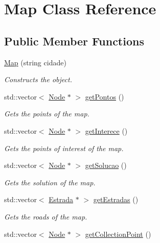 \hypertarget{class_map}{}\section{Map Class Reference}
\label{class_map}
\subsection*{Public Member Functions}
\begin{DoxyCompactItemize}
\item 
\mbox{\hyperlink{class_map_a5376d6db6b0115c9260976e44f2956a0}{Map}} (string cidade)
\begin{DoxyCompactList}\small\item\em Constructs the object. \end{DoxyCompactList}\item 
std\+::vector$<$ \mbox{\hyperlink{class_node}{Node}} $\ast$ $>$ \mbox{\hyperlink{class_map_adfbd0b149bb751e0ac8696c75b7649a6}{get\+Pontos}} ()
\begin{DoxyCompactList}\small\item\em Gets the points of the map. \end{DoxyCompactList}\item 
std\+::vector$<$ \mbox{\hyperlink{class_node}{Node}} $\ast$ $>$ \mbox{\hyperlink{class_map_a1f3f1eff9d45c161fba74967a52a0d0f}{get\+Interece}} ()
\begin{DoxyCompactList}\small\item\em Gets the points of interest of the map. \end{DoxyCompactList}\item 
std\+::vector$<$ \mbox{\hyperlink{class_node}{Node}} $\ast$ $>$ \mbox{\hyperlink{class_map_ab13f74de95fc679221c7c46f327fb43e}{get\+Solucao}} ()
\begin{DoxyCompactList}\small\item\em Gets the solution of the map. \end{DoxyCompactList}\item 
std\+::vector$<$ \mbox{\hyperlink{class_estrada}{Estrada}} $\ast$ $>$ \mbox{\hyperlink{class_map_acae882d7517fc82f90893cb5ffd08fee}{get\+Estradas}} ()
\begin{DoxyCompactList}\small\item\em Gets the roads of the map. \end{DoxyCompactList}\item 
std\+::vector$<$ \mbox{\hyperlink{class_node}{Node}} $\ast$ $>$ \mbox{\hyperlink{class_map_ab4147e61d5abf3134ec7c4701f539f4b}{get\+Collection\+Point}} ()

\end{DoxyCompactItemize}
